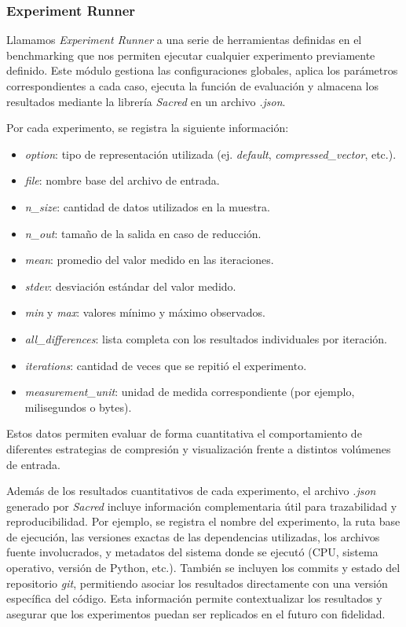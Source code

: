 \subsubsection{Experiment Runner}

Llamamos \textit{Experiment Runner} a una serie de herramientas definidas en el benchmarking que nos permiten ejecutar cualquier experimento previamente definido. Este módulo gestiona las configuraciones globales, aplica los parámetros correspondientes a cada caso, ejecuta la función de evaluación y almacena los resultados mediante la librería \textit{Sacred} en un archivo \textit{.json}.

Por cada experimento, se registra la siguiente información:

\begin{itemize}
    \item \textit{option}: tipo de representación utilizada (ej. \textit{default}, \textit{compressed\_vector}, etc.).
    \item \textit{file}: nombre base del archivo de entrada.
    \item \textit{n\_size}: cantidad de datos utilizados en la muestra.
    \item \textit{n\_out}: tamaño de la salida en caso de reducción.
    \item \textit{mean}: promedio del valor medido en las iteraciones.
    \item \textit{stdev}: desviación estándar del valor medido.
    \item \textit{min} y \textit{max}: valores mínimo y máximo observados.
    \item \textit{all\_differences}: lista completa con los resultados individuales por iteración.
    \item \textit{iterations}: cantidad de veces que se repitió el experimento.
    \item \textit{measurement\_unit}: unidad de medida correspondiente (por ejemplo, milisegundos o bytes).
\end{itemize}

Estos datos permiten evaluar de forma cuantitativa el comportamiento de diferentes estrategias de compresión y visualización frente a distintos volúmenes de entrada.

Además de los resultados cuantitativos de cada experimento, el archivo \textit{.json} generado por \textit{Sacred} incluye información complementaria útil para trazabilidad y reproducibilidad. Por ejemplo, se registra el nombre del experimento, la ruta base de ejecución, las versiones exactas de las dependencias utilizadas, los archivos fuente involucrados, y metadatos del sistema donde se ejecutó (CPU, sistema operativo, versión de Python, etc.). También se incluyen los commits y estado del repositorio \textit{git}, permitiendo asociar los resultados directamente con una versión específica del código. Esta información permite contextualizar los resultados y asegurar que los experimentos puedan ser replicados en el futuro con fidelidad.

